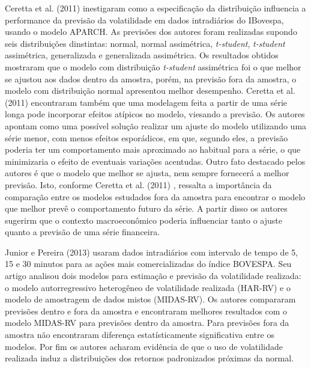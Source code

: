 \documentclass[]{article}
\begin{document}
Ceretta et al. (2011) inestigaram como a especificação da distribuição
influencia a performance da previsão da volatilidade em dados
intradiários do IBovespa, usando o modelo APARCH. As previsões dos
autores foram realizadas supondo seis distribuições dinstintas: normal,
normal assimétrica, \emph{t-student}, \emph{t-student} assimétrica,
generalizada e generalizada assimétrica. Os resultados obtidos mostraram
que o modelo com distribuição \emph{t-student} assimétrica foi o que
melhor se ajustou aos dados dentro da amostra, porém, na previsão fora
da amostra, o modelo com distribuição normal apresentou melhor
desempenho. Ceretta et al. (2011) encontraram também que uma modelagem
feita a partir de uma série longa pode incorporar efeitos atípicos no
modelo, viesando a previsão. Os autores apontam como uma possível
solução realizar um ajuste do modelo utilizando uma série menor, com
menos efeitos esporádicos, em que, segundo eles, a previsão poderia ter
um comportamento mais aproximado ao habitual para a série, o que
minimizaria o efeito de eventuais variações acentudas. Outro fato
destacado pelos autores é que o modelo que melhor se ajusta, nem sempre
fornecerá a melhor previsão. Isto, conforme Ceretta et al. (2011) ,
ressalta a importância da comparação entre os modelos estudados fora da
amostra para encontrar o modelo que melhor prevê o comportamento futuro
da série. A partir disso os autores sugerirm que o contexto
macroeconômico poderia influenciar tanto o ajuste quanto a previsão de
uma série financeira.

Junior e Pereira (2013) usaram dados intradiários com intervalo de tempo
de 5, 15 e 30 minutos para as ações mais comercializadas do índice
BOVESPA. Seu artigo analisou dois modelos para estimação e previsão da
volatilidade realizada: o modelo autorregressivo heterogêneo de
volatilidade realizada (HAR-RV) e o modelo de amostragem de dados mistos
(MIDAS-RV). Os autores compararam previsões dentro e fora da amostra e
encontraram melhores resultados com o modelo MIDAS-RV para previsões
dentro da amostra. Para previsões fora da amostra não encontraram
diferença estatísticamente significativa entre os modelos. Por fim os
autores acharam evidência de que o uso de volatilidade realizada induz a
distribuições dos retornos padronizados próximas da normal.
\end{document}
